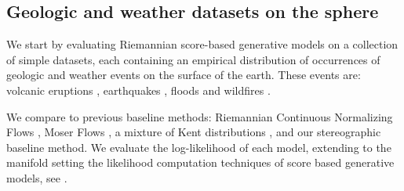 \subsection{Geologic and weather datasets on the sphere}
\label{sec:exp_sphere}


We start by evaluating Riemannian score-based generative models on a collection of simple datasets, each containing an empirical distribution of occurrences of geologic and weather events on the surface of the earth.
These events are: volcanic eruptions \cite{volcanoe_dataset}, earthquakes \cite{earthquake_dataset}, floods \parencite{flood_dataset} and wildfires \parencite{fire_dataset}.

We compare to previous baseline methods: Riemannian Continuous Normalizing Flows \parencite{mathieu2020riemannian}, Moser Flows \parencite{rozen2021moser}, a mixture of Kent distributions \parencite{peel2001fitting}, and our stereographic baseline method.
We evaluate the log-likelihood of each model, extending to the manifold setting the likelihood computation techniques of score based generative models, see .

